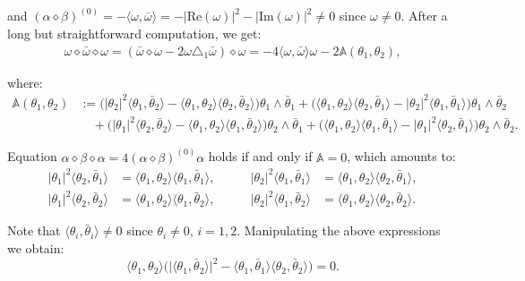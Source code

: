 \documentclass[10pt,a4paper,twoside,reqno]{amsart}
\theoremstyle{plain}
\theoremstyle{definition}
\theoremstyle{remark}
\def\Re{\mathrm{Re}}
\def\Im{\mathrm{Im}}
\newcommand{\abs}[1]{\left\lvert#1\right\rvert}
\newcommand{\escal}[1]{\langle#1\rangle}
\begin{document}
\noindent
and $(\alpha\diamond\beta)^{(0)}=-\escal{\omega,\bar\omega}=-\abs{\Re(\omega)}^2-\abs{\Im(\omega)}^2\neq0$ since $\omega\neq0$. After a long but straightforward computation, we get: 
\begin{eqnarray*}
 \omega\diamond\bar\omega\diamond\omega=(\bar\omega\diamond\omega-2\omega\triangle_1\bar\omega)\diamond\omega=-4\escal{\omega,\bar\omega}\omega-2\mathbb{A}(\theta_1,\theta_2),
\end{eqnarray*}

\noindent
where: 
\begin{align*}
\mathbb{A}(\theta_1,\theta_2)&:=\big(\abs{\theta_2}^2\escal{\theta_1,\bar\theta_2}-\escal{\theta_1,\theta_2}\escal{\theta_2,\bar\theta_2}\big)\theta_1\wedge\bar\theta_1+\big(\escal{\theta_1,\theta_2}\escal{\theta_2,\bar\theta_1}-\abs{\theta_2}^2\escal{\theta_1,\bar\theta_1}\big)\theta_1\wedge\bar\theta_2\\
&\quad+\big(\abs{\theta_1}^2\escal{\theta_2,\bar\theta_2}-\escal{\theta_1,\theta_2}\escal{\theta_1,\bar\theta_2}\big)\theta_2\wedge\bar\theta_1+\big(\escal{\theta_1,\theta_2}\escal{\theta_1,\bar\theta_1}-\abs{\theta_1}^2\escal{\theta_2,\bar\theta_1}\big)\theta_2\wedge\bar\theta_2.
\end{align*}

\noindent
Equation $\alpha\diamond\beta\diamond\alpha=4(\alpha\diamond\beta)^{(0)}\alpha$ holds if and only if $\mathbb{A}=0$, which amounts to: 
$$\begin{aligned}
    \abs{\theta_1}^2\escal{\theta_2,\bar\theta_1}&=\escal{\theta_1,\theta_2}\escal{\theta_1,\bar\theta_1},\\
    \abs{\theta_1}^2\escal{\theta_2,\bar\theta_2}&=\escal{\theta_1,\theta_2}\escal{\theta_1,\bar\theta_2},
\end{aligned}\qquad\begin{aligned}
    \abs{\theta_2}^2\escal{\theta_1,\bar\theta_1}&=\escal{\theta_1,\theta_2}\escal{\theta_2,\bar\theta_1},\\
    \abs{\theta_2}^2\escal{\theta_1,\bar\theta_2}&=\escal{\theta_1,\theta_2}\escal{\theta_2,\bar\theta_2}.
\end{aligned}$$

\noindent
Note that $\escal{\theta_i,\bar\theta_i}\neq0$ since $\theta_i\neq0$, $i=1,2$. Manipulating the above expressions we obtain: 
\begin{equation*}
 \escal{\theta_1,\theta_2}\big(\lvert\escal{\theta_1,\bar\theta_2}\rvert^2-\escal{\theta_1,\bar\theta_1}\escal{\theta_2,\bar\theta_2}\big)=0.
\end{equation*}
 
\end{document}
